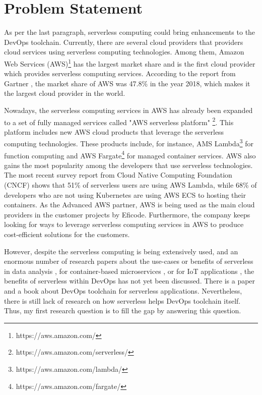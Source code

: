 \section{Problem Statement}
As per the last paragraph, serverless computing could bring enhancements to the DevOps toolchain. Currently, there are several cloud providers that providers cloud services using serverless computing technologies. 
Among them, Amazon Web Services (AWS)\footnote{https://aws.amazon.com/} has the largest market share and is the first cloud provider which provides serverless computing services. According to the report from Gartner \cite{GartnerS47:online}, the market share of AWS was 47.8\% in the year 2018, which makes it the largest cloud provider in the world.
\par
Nowadays, the serverless computing services in AWS has already been expanded to a set of fully managed services called "AWS serverless platform" \footnote{https://aws.amazon.com/serverless/}. This platform includes new AWS cloud products that leverage the serverless computing technologies. These products include, for instance, AMS Lambda\footnote{https://aws.amazon.com/lambda/} for function computing and AWS Fargate\footnote{https://aws.amazon.com/fargate/} for managed container services.
AWS also gains the most popularity among the developers that use serverless technologies. The most recent survey report \cite{cncf2020} from Cloud Native Computing Foundation (CNCF) shows that 51\% of serverless users are using AWS Lambda, while 68\% of developers who are not using Kubernetes are using AWS ECS to hosting their containers.
As the Advanced AWS partner, AWS is being used as the main cloud providers in the customer projects by Eficode. Furthermore, the company keeps looking for ways to leverage serverless computing services in AWS to produce cost-efficient solutions for the customers.
\par
However, despite the serverless computing is being extensively used, and an enormous number of research papers about the use-cases or benefits of serverless in data analysis \cite{8457831}, for container-based microservices \cite{perez2018serverless}, or for IoT applications \cite{nastic2017serverless} \cite{glikson2017deviceless}, the benefits of serverless within DevOps has not yet been discussed. There is a paper \cite{ivanov2018implementation} and a book \cite{bangera2018devops} about DevOps toolchain for serverless applications. Nevertheless, there is still lack of research on how serverless helps DevOps toolchain itself. Thus, my first research question is to fill the gap by answering this question. 

